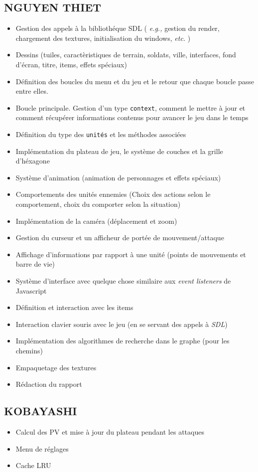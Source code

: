 \documentclass{article}
\begin{document}
\subsection{NGUYEN THIET}
\begin{itemize}
    \item Gestion des appels à la bibliothéque SDL ( \textit{e.g.,} gestion du render, chargement des textures, initialisation
    du windows, \textit{etc.} )
    \item Dessins (tuiles, caractèristiques de terrain, soldats, ville, interfaces, fond d'écran, titre, items, effets spéciaux)
    \item Définition des boucles du menu et du jeu et le retour que chaque boucle passe entre elles.
    \item Boucle principale. Gestion d'un type \texttt{context}, comment le mettre à jour et comment récupérer informations contenus pour avancer le jeu dans le temps
    \item Définition du type des \texttt{unités} et les méthodes associées
    \item Implémentation du plateau de jeu, le système de couches et la grille d'héxagone 
    \item Système d'animation (animation de personnages et effets spéciaux)
    \item Comportements des unités ennemies (Choix des actions selon le comportement, choix du comporter selon la situation)
    \item Implémentation de la caméra (déplacement et zoom)
    \item Gestion du curseur et un afficheur de portée de mouvement/attaque
    \item Affichage d'informations par rapport à une unité (points de mouvements et barre de vie)
    \item Système d'interface avec quelque chose similaire aux \textit{event listeners} de Javascript
    \item Définition et interaction avec les items
    \item Interaction clavier souris avec le jeu (en se servant des appels à \textit{SDL})
    \item Implémentation des algorithmes de recherche dans le graphe (pour les chemins)
    \item Empaquetage des textures
    \item Rédaction du rapport
\end{itemize}

\subsection{KOBAYASHI}
\begin{itemize}
    \item Calcul des PV et mise à jour du plateau pendant les attaques 
    \item Menu de réglages 
    \item Cache LRU %
\end{itemize}
\end{document}
